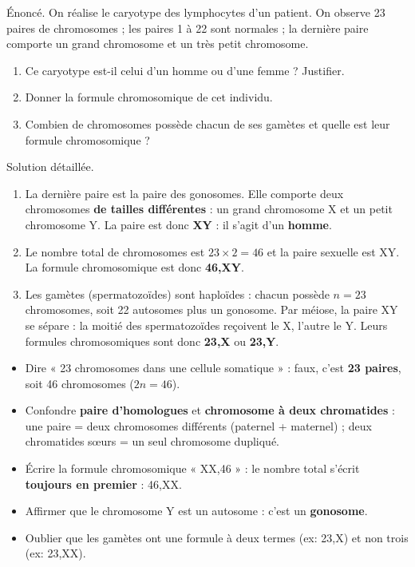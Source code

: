\documentclass[11pt]{article}
\begin{document}
\begin{exoresolu}
Énoncé. On réalise le caryotype des lymphocytes d'un patient. On observe 23 paires de chromosomes ; les paires 1 à 22 sont normales ; la dernière paire comporte un grand chromosome et un très petit chromosome.
\begin{enumerate}
\item Ce caryotype est-il celui d'un homme ou d'une femme ? Justifier.
\item Donner la formule chromosomique de cet individu.
\item Combien de chromosomes possède chacun de ses gamètes et quelle est leur formule chromosomique ?
\end{enumerate}
\tcblower
Solution détaillée.
\begin{enumerate}
\item La dernière paire est la paire des gonosomes. Elle comporte deux chromosomes \textbf{de tailles différentes} : un grand chromosome X et un petit chromosome Y. La paire est donc \textbf{XY} : il s'agit d'un \textbf{homme}.
\item Le nombre total de chromosomes est $23 \times 2 = 46$ et la paire sexuelle est XY. La formule chromosomique est donc \textbf{46,XY}.
\item Les gamètes (spermatozoïdes) sont haploïdes : chacun possède $n = 23$ chromosomes, soit 22 autosomes plus un gonosome. Par méiose, la paire XY se sépare : la moitié des spermatozoïdes reçoivent le X, l'autre le Y. Leurs formules chromosomiques sont donc \textbf{23,X} ou \textbf{23,Y}.
\end{enumerate}
\end{exoresolu}

\begin{attention}
\begin{itemize}
\item Dire « 23 chromosomes dans une cellule somatique » : faux, c'est \textbf{23 paires}, soit 46 chromosomes ($2n = 46$).
\item Confondre \textbf{paire d'homologues} et \textbf{chromosome à deux chromatides} : une paire = deux chromosomes différents (paternel + maternel) ; deux chromatides sœurs = un seul chromosome dupliqué.
\item Écrire la formule chromosomique « XX,46 » : le nombre total s'écrit \textbf{toujours en premier} : 46,XX.
\item Affirmer que le chromosome Y est un autosome : c'est un \textbf{gonosome}.
\item Oublier que les gamètes ont une formule à deux termes (ex: 23,X) et non trois (ex: 23,XX).
\end{itemize}
\end{attention}
\end{document}
